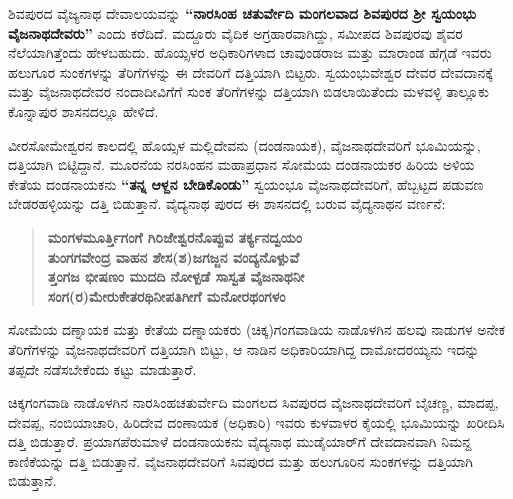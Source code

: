 ಶಿವಪುರದ ವೈಜ್ಯನಾಥ ದೇವಾಲಯವನ್ನು \textbf{“ನಾರಸಿಂಹ ಚತುರ್ವೇದಿ ಮಂಗಲವಾದ ಶಿವಪುರದ ಶ‍್ರೀ ಸ್ವಯಂಭು ವೈಜನಾಥದೇವರು”} ಎಂದು ಕರೆದಿದೆ. ಮದ್ದೂರು ವೈದಿಕ ಅಗ್ರಹಾರವಾಗಿದ್ದು, ಸಮೀಪದ ಶಿವಪುರವು ಶೈವರ ನೆಲೆಯಾಗಿತ್ತೆಂದು ಹೇಳಬಹುದು. ಹೊಯ್ಸಳರ ಅಧಿಕಾರಿಗಳಾದ ಚಾವುಂಡರಾಜ ಮತ್ತು ಮಾರಾಂಡ ಹೆಗ್ಗಡೆ ಇವರು ಹಲುಗೂರ ಸುಂಕಗಳನ್ನು ತೆರಿಗೆಗಳನ್ನು ಈ ದೇವರಿಗೆ ದತ್ತಿಯಾಗಿ ಬಿಟ್ಟರು. ಸ್ವಯಂಭುವೇಶ್ವರ ದೇವರ ದೇವದಾನಕ್ಕೆ ಮತ್ತು ವೈಜನಾಥದೇವರ ನಂದಾದೀವಿಗೆಗೆ ಸುಂಕ ತೆರಿಗೆಗಳನ್ನು ದತ್ತಿಯಾಗಿ ಬಿಡಲಾಯಿತೆಂದು ಮಳವಳ್ಳಿ ತಾಲ್ಲೂಕು ಕೊನ್ನಾಪುರ ಶಾಸನದಲ್ಲೂ ಹೇಳಿದೆ.

ವೀರಸೋಮೇಶ್ವರನ ಕಾಲದಲ್ಲಿ ಹೊಯ್ಸಳ ಮಲ್ಲಿದೇವನು (ದಂಡನಾಯಕ), ವೈಜನಾಥದೇವರಿಗೆ ಭೂಮಿಯನ್ನು, ದತ್ತಿಯಾಗಿ ಬಿಟ್ಟಿದ್ದಾನೆ. ಮೂರನೆಯ ನರಸಿಂಹನ ಮಹಾಪ್ರಧಾನ ಸೋಮೆಯ ದಂಡನಾಯಕರ ಹಿರಿಯ ಅಳಿಯ ಕೇತೆಯ ದಂಡನಾಯಕನು \textbf{“ತನ್ನ ಆಳ್ದನ ಬೇಡಿಕೊಂಡು”} ಸ್ವಯಂಭೂ ವೈಜನಾಥದೇವರಿಗೆ, ಹೆಬ್ಬಟ್ಟದ ಪಡುವಣ ಬೇಡರಹಳ್ಳಿಯನ್ನು ದತ್ತಿ ಬಿಡುತ್ತಾನೆ. ವೈದ್ಯನಾಥ ಪುರದ ಈ ಶಾಸನದಲ್ಲಿ ಬರುವ ವೈದ್ಯನಾಥನ ವರ್ಣನೆ:

\begin{verse}
\textbf{ಮಂಗಳಮೂರ್ತ್ತಿಗಂಗೆ ಗಿರಿಜೇಶ್ವರನೊಪ್ಪುವ ತರ್ಕ್ಯನದ್ವಯಂ} \\\textbf{ತುಂಗಗವೇಂದ್ರ ವಾಹನ ಶೇಸ(ಶ)ಜಗಜ್ಜನ ವಂದ್ಯನೊಳ್ಪುವೆ} \\\textbf{ತ್ತಂಗಜ ಭೀಷಣಂ ಮುದದಿ ನೋಳ್ಪಡೆ ಸಾಸ್ವತ ವೈಜನಾಥನೀ} \\\textbf{ಸಂಗ(ರ)ಮೇರುಕೇತರಥಿನೀಪತಿಗೀಗೆ ಮನೋರಥಂಗಳಂ }
\end{verse}

ಸೋಮೆಯ ದಣ್ನಾಯಕ ಮತ್ತು ಕೇತೆಯ ದಣ್ನಾಯಕರು (ಚಿಕ್ಕ)ಗಂಗವಾಡಿಯ ನಾಡೊಳಗಿನ ಹಲವು ನಾಡುಗಳ ಅನೇಕ ತೆರಿಗೆಗಳನ್ನು ವೈಜನಾಥದೇವರಿಗೆ ದತ್ತಿಯಾಗಿ ಬಿಟ್ಟು, ಆ ನಾಡಿನ ಅಧಿಕಾರಿಯಾಗಿದ್ದ ದಾಮೋದರಯ್ಯನು ಇದನ್ನು ತಪ್ಪದೇ ನಡೆಸಬೇಕೆಂದು ಕಟ್ಟು ಮಾಡುತ್ತಾರೆ.

ಚಿಕ್ಕಗಂಗವಾಡಿ ನಾಡೊಳಗಿನ ನಾರಸಿಂಹಚತುರ್ವೇದಿ ಮಂಗಲದ ಸಿವಪುರದ ವೈಜನಾಥದೇವರಿಗೆ ಬೈಚಣ್ಣ, ಮಾದಪ್ಪ, ದೇವಪ್ಪ, ನಂಬಿಯಾಚಾರಿ, ಹಿರಿದೇವ ದಂಣಾಯಕ (ಅಧಿಕಾರಿ) ಇವರು ಕುಳವಾಳರ ಕೈಯಲ್ಲಿ ಭೂಮಿಯನ್ನು ಖರೀದಿಸಿ ದತ್ತಿ ಬಿಡುತ್ತಾರೆ. ಪ್ರಯಾಗಪೆರುಮಾಳೆ ದಂಡನಾಯಕನು ವೈದ್ಯನಾಥ ಮುಡೈಯಾರ್​ಗೆ ದೇವದಾನವಾಗಿ ನಿಮನ್ದ ಕಾಣಿಕೆಯನ್ನು ದತ್ತಿ ಬಿಡುತ್ತಾನೆ. ವೈಜನಾಥದೇವರಿಗೆ ಸಿವಪುರದ ಮತ್ತು ಹಲುಗೂರಿನ ಸುಂಕಗಳನ್ನು ದತ್ತಿಯಾಗಿ ಬಿಡುತ್ತಾನೆ.

